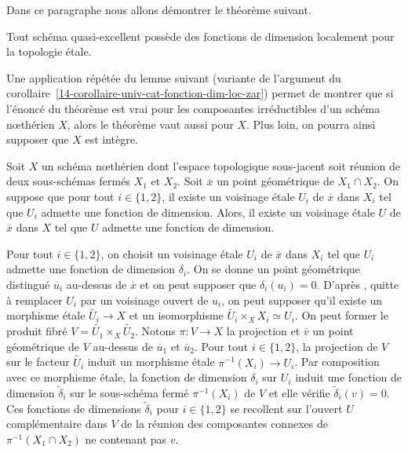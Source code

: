 \documentclass[10pt]{../fichiers-configuration-latex/smfart}
\begin{document}
Dans ce paragraphe nous allons démontrer le théorème suivant.

\begin{theoreme2}[Gabber]\label{14-theoreme-exist-local-et-fn-dim} Tout schéma quasi-excellent
possède des fonctions de dimension localement pour la topologie étale.  \end{theoreme2}

Une application répétée du lemme suivant (variante de l'argument du
corollaire~\ref{14-corollaire-univ-cat-fonction-dim-loc-zar}) permet de montrer que si l'énoncé du
théorème est vrai pour les composantes irréductibles d'un schéma nœthérien $X$, alors le théorème
vaut aussi pour $X$. Plus loin, on pourra ainsi supposer que $X$ est intègre.

\begin{lemme2} Soit $X$ un schéma nœthérien dont l'espace topologique sous-jacent soit réunion de
deux sous-schémas fermés $X_1$ et $X_2$. Soit $\overline x$ un point géométrique de $X_1\cap X_2$.
On suppose que pour tout $i\in\{1,2\}$, il existe un voisinage étale $U_i$ de $\overline x$ dans
$X_i$ tel que $U_i$ admette une fonction de dimension.  Alors, il existe un voisinage étale $U$ de
$\overline x$ dans $X$ tel que $U$ admette une fonction de dimension.  \end{lemme2}

\begin{démo} Pour tout $i\in\{1,2\}$, on choisit un voisinage étale $U_i$ de $\overline x$ dans
$X_i$ tel que $U_i$ admette une fonction de dimension $\delta_i$. On se donne un point géométrique
distingué $\overline u_i$ au-dessus de $\overline x$ et on peut supposer que $\delta_i(u_i)=0$.
D'après , quitte à remplacer $U_i$ par un voisinage ouvert de $u_i$, on peut
supposer qu'il existe un morphisme étale $\widetilde{U_i}\to X$ et un isomorphisme
$\widetilde{U_i}\times_X{X_i}\simeq U_i$. On peut former le produit fibré $V=\widetilde{U_1}\times_X
\widetilde{U_2}$. Notons $\pi\colon V\to X$ la projection et $\overline{v}$ un point géométrique de
$V$ au-dessus de $\overline{u}_1$ et $\overline{u}_2$. Pour tout $i\in\{1,2\}$, la projection de $V$
sur le facteur $\widetilde{U_i}$ induit un morphisme étale $\pi^{-1}(X_i)\to U_i$. Par composition
avec ce morphisme étale, la fonction de dimension $\delta_i$ sur $U_i$ induit une fonction de
dimension $\tilde{\delta}_i$ sur le sous-schéma fermé $\pi^{-1}(X_i)$ de $V$ et elle vérifie
$\tilde{\delta}_i(v)=0$. Ces fonctions de dimensions $\tilde{\delta}_i$ pour $i\in\{1,2\}$ se
recollent sur l'ouvert $U$ complémentaire dans $V$ de la réunion des composantes connexes de
$\pi^{-1}(X_1\cap X_2)$ ne contenant pas $v$.  \end{démo}
\end{document}
